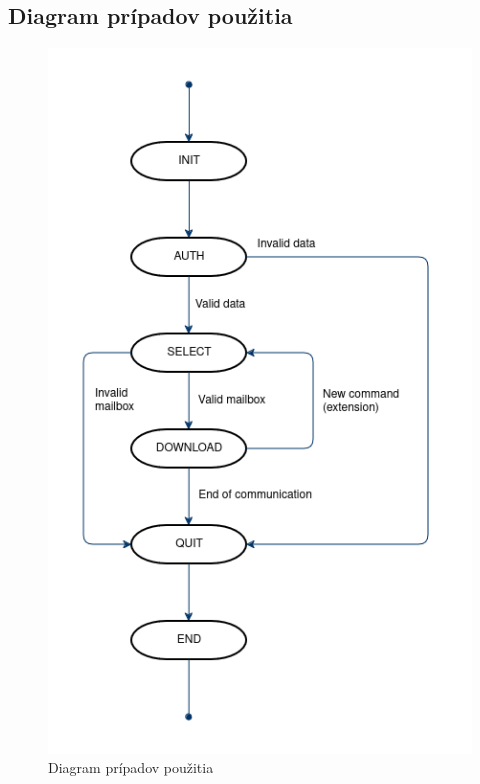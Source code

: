 \documentclass[a4paper, 11pt]{article}
\begin{document}
    \subsection{Diagram prípadov použitia}
	\label{subsection:usecase}
	\begin{figure}[!ht]
		\centering
		\vspace{1cm}
		\includegraphics[width=0.5\linewidth]{res/diagram_usecase.png}
		\caption{Diagram prípadov použitia}
		\label{figure:usecase}
	\end{figure}

	\clearpage
\end{document}
